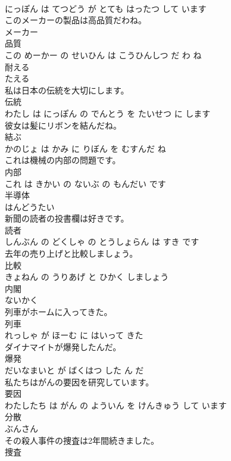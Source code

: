 \documentclass[8pt]{extreport}
\begin{document}
\begin{CJK}{UTF8}{min}
\\	にっぽん は てつどう が とても はったつ して います			
\\	このメーカーの製品は高品質だわね。	
\\	メーカー 
\\	品質 
\\	この めーかー の せいひん は こうひんしつ だ わ ね			
\\	耐える	
\\	たえる		
\\	私は日本の伝統を大切にします。	
\\	伝統 
\\	わたし は にっぽん の でんとう を たいせつ に します			
\\	彼女は髪にリボンを結んだね。	
\\	結ぶ 
\\	かのじょ は かみ に りぼん を むすんだ ね			
\\	これは機械の内部の問題です。	
\\	内部 
\\	これ は きかい の ないぶ の もんだい です			
\\	半導体	
\\	はんどうたい		
\\	新聞の読者の投書欄は好きです。	
\\	読者 
\\	しんぶん の どくしゃ の とうしょらん は すき です			
\\	去年の売り上げと比較しましょう。	
\\	比較 
\\	きょねん の うりあげ と ひかく しましょう			
\\	内閣	
\\	ないかく		
\\	列車がホームに入ってきた。	
\\	列車 
\\	れっしゃ が ほーむ に はいって きた			
\\	ダイナマイトが爆発したんだ。	
\\	爆発 
\\	だいなまいと が ばくはつ した ん だ			
\\	私たちはがんの要因を研究しています。	
\\	要因 
\\	わたしたち は がん の よういん を けんきゅう して います			
\\	分散	
\\	ぶんさん		
\\	その殺人事件の捜査は2年間続きました。	
\\	捜査 

\end{CJK}
\end{document}

